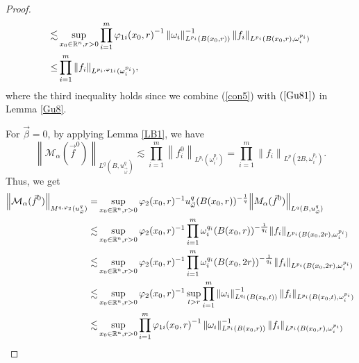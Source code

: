 \documentclass[11pt, twoside, leqno]{article}
\begin{document}
\begin{proof}[Proof]
\begin{align}
	\lesssim&\mathop {\sup }\limits_{{x_0} \in {\mathbb R^n},r > 0} \prod\limits_{i = 1}^m {{\varphi _{1i}}{{({x_0},r)}^{ - 1}}\left\| {{\omega _i}} \right\|_{{L^{{p_i}}}(B({x_0},r))}^{ - 1}{{\left\| {{f_i}} \right\|}_{{L^{{p_i}}}(B({x_0},r),\omega _i^{{p_i}})}}}\notag\\
	\le&\prod\limits_{i = 1}^m {{{\left\| {{f_i}} \right\|}_{{L^{{p_i},{\varphi _{1i}}}}(\omega _i^{{p_i}})}}},
	\end{align}
	where the third inequality holds since we combine (\ref{con5}) with $(\ref{Gu81})$ in Lemma \ref{Gu8}.
	
	For $\vec \beta = 0$, by applying Lemma \ref{LB1}, we have
	\begin{equation*}
	{\left\| {{\mathcal{M}_\alpha }({{\vec f}^0})} \right\|_{{L^q}(B,u_{\vec \omega }^q)}} \lesssim \prod\limits_{i = 1}^m {{{\left\| {f_i^0} \right\|}_{{L^{{p_i}}}(\omega _i^{{p_i}})}}}  = \prod\limits_{i = 1}^m {{{\left\| {{f_i}} \right\|}_{{L^p}(2B,\omega _i^{{p_i}})}}}.
	\end{equation*}
	Thus, we get
	\begin{align}\label{ieq2}
	{\left\| {{\mathcal{M}_\alpha }({{\vec f}^{0}})} \right\|_{{M^{q,{\varphi _{2}}}}(u_{\vec \omega }^q)}} =&\mathop {\sup }\limits_{{x_0} \in \rn,r > 0} {\varphi _2}{({x_0},r)^{ - 1}}u_{\vec \omega }^q{(B({x_0},r))^{ - \frac{1}{q}}}{\left\| {{M_\alpha }({{\vec f}^0})} \right\|_{{L^q}(B,u_{\vec \omega }^q)}}\notag\\
	\lesssim&\mathop {\sup }\limits_{{x_0} \in \rn,r > 0} {\varphi _2}{({x_0},r)^{ - 1}}\prod\limits_{i = 1}^m {\omega _i^{{q_i}}{{(B({x_0},r))}^{ - \frac{1}{{{q_i}}}}}{{\left\| {{f_i}} \right\|}_{{L^{{p_i}}}(B({x_0},2r),\omega _i^{{p_i}})}}}\notag\\
	\lesssim&\mathop {\sup }\limits_{{x_0} \in \rn,r > 0} {\varphi _2}{({x_0},r)^{ - 1}}\prod\limits_{i = 1}^m {\omega _i^{{q_i}}{{(B({x_0},2r))}^{ - \frac{1}{{{q_i}}}}}{{\left\| {{f_i}} \right\|}_{{L^{{p_i}}}(B({x_0},2r),\omega _i^{{p_i}})}}}\notag\\
	\lesssim&\mathop {\sup }\limits_{{x_0} \in {\rn},r > 0} {\varphi _2}{({x_0},r)^{ - 1}}\mathop {\sup }\limits_{t > r} \prod\limits_{i = 1}^m {\left\| {{\omega _i}} \right\|_{{L^{{q_i}}}(B({x_0},t))}^{ - 1}{{\left\| {{f_i}} \right\|}_{{L^{{p_i}}}(B({x_0},t),\omega _i^{{p_i}})}}}\notag\\
	\lesssim&\mathop {\sup }\limits_{{x_0} \in \rn,r > 0} \prod\limits_{i = 1}^m {{\varphi _{1i}}{{({x_0},r)}^{ - 1}}\left\| {{\omega _i}} \right\|_{{L^{{p_i}}}(B({x_0},r))}^{ - 1}{{\left\| {{f_i}} \right\|}_{{L^{{p_i}}}(B({x_0},r),\omega _i^{{p_i}})}}}\notag\\

\end{align}
\end{proof}
\end{document}
